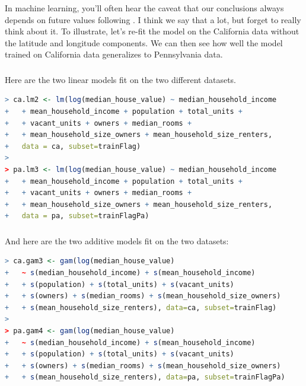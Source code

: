 \documentclass[xetex,mathserif,serif,aspectratio=169]{beamer}
\begin{document}
\begin{frame}[fragile] \frametitle{} \oldB \small

In machine learning, you'll often hear the caveat that our conclusions
always depends on future values following .
I think we say that a lot, but forget to really think about it.
To illustrate, let's re-fit the model on the California data without
the latitude and longitude components. We can then see how well the
model trained on California data generalizes to Pennsylvania data.

\end{frame}

\begin{frame}[fragile] \frametitle{} \oldB \small

Here are the two linear models fit on the two different datasets.
\begin{lstlisting}[language=R, basicstyle=\ttfamily]
> ca.lm2 <- lm(log(median_house_value) ~ median_household_income
+   + mean_household_income + population + total_units +
+   + vacant_units + owners + median_rooms +
+   + mean_household_size_owners + mean_household_size_renters,
+   data = ca, subset=trainFlag)
>
> pa.lm3 <- lm(log(median_house_value) ~ median_household_income
+   + mean_household_income + population + total_units +
+   + vacant_units + owners + median_rooms +
+   + mean_household_size_owners + mean_household_size_renters,
+   data = pa, subset=trainFlagPa)
\end{lstlisting}

\end{frame}


\begin{frame}[fragile] \frametitle{} \oldB \small

And here are the two additive models fit on the two datasets:
\begin{lstlisting}[language=R, basicstyle=\ttfamily]
> ca.gam3 <- gam(log(median_house_value)
+   ~ s(median_household_income) + s(mean_household_income)
+   + s(population) + s(total_units) + s(vacant_units)
+   + s(owners) + s(median_rooms) + s(mean_household_size_owners)
+   + s(mean_household_size_renters), data=ca, subset=trainFlag)
>
> pa.gam4 <- gam(log(median_house_value)
+   ~ s(median_household_income) + s(mean_household_income)
+   + s(population) + s(total_units) + s(vacant_units)
+   + s(owners) + s(median_rooms) + s(mean_household_size_owners)
+   + s(mean_household_size_renters), data=pa, subset=trainFlagPa)
\end{lstlisting}

\end{frame}
\end{document}
